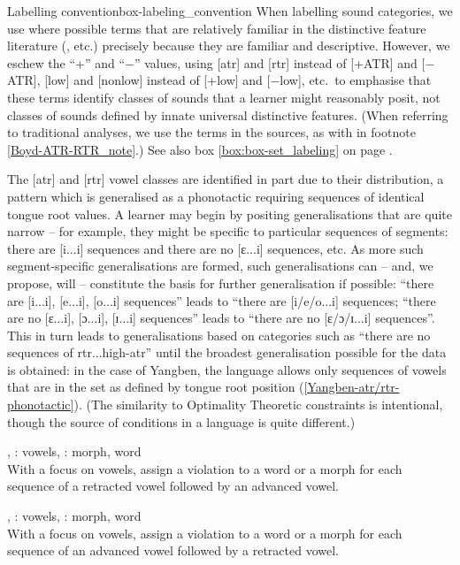 \begin{dadpbox}{Labelling convention}{box-labeling_convention}
When labelling sound categories, we use where possible terms that are relatively familiar in the distinctive feature literature (\citealt{Jakobson+:1954, Chomsky+:1968}, etc.) precisely because they are familiar and descriptive. However,  we eschew the ``+'' and ``$-$'' values, using [atr] and [rtr] instead of [+ATR] and [$-$ATR], [low] and [nonlow] instead of [+low] and [$-$low], etc.\ to emphasise that these terms  identify classes of sounds that a learner might reasonably posit, not classes of sounds defined by innate universal distinctive features. (When referring to traditional analyses, we use the terms in the sources, as with \citealt{Boyd:2015} in footnote \ref{Boyd-ATR-RTR_note}.) See also box \ref{box:box-set_labeling} on page \pageref{box:box-set_labeling}.
\end{dadpbox}


The [atr] and [rtr] vowel classes are identified in part due to their distribution, a pattern which is generalised as a phonotactic requiring sequences of identical tongue root values. A learner may begin by positing generalisations that are quite narrow -- for example, they might be specific to particular sequences of segments: there are  [i...i] sequences and there are no [ɛ...i] sequences, etc. As more such segment-specific generalisations are formed, such generalisations can -- and, we propose, will -- constitute the basis for further generalisation if possible: ``there are [i...i], [e...i], [o...i] sequences'' leads to ``there are [i/e/o...i] sequences; ``there are no [ɛ...i], [ɔ...i], [ɪ...i] sequences'' leads to ``there are no [ɛ/ɔ/ɪ...i] sequences''. This in turn leads to generalisations based on categories such as ``there are  no sequences of rtr...high-atr'' until the broadest generalisation possible for the data is obtained: in the case of Yangben,  the language  allows only sequences of vowels that are in the set as defined by tongue root position  (\ref{Yangben-atr/rtr-phonotactic}). (The similarity to Optimality Theoretic constraints is intentional, though the source of conditions in a language is quite different.)

\begin{example}  \label{Yangben-atr/rtr-phonotactic}
    \ea \latr,  \tier: vowels, \dom: morph, word\\
        With a focus on vowels, assign a violation to  a word or a morph for each sequence of a retracted vowel  followed  by an advanced vowel.
        
    \ex \ratr, \tier: vowels, \dom: morph, word\\
        With a focus on vowels, assign a violation to  a word or a morph for each sequence of an advanced vowel followed by a retracted vowel.
    \z
\end{example}

